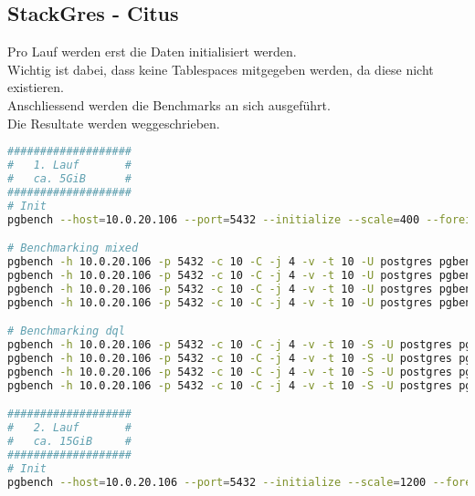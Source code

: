 
\begin{flushleft}
    \subsection{StackGres - Citus}
    \label{subsec:stackgres_citus_benchmarking_commands}
    Pro Lauf werden erst die Daten initialisiert werden.\\
    Wichtig ist dabei, dass keine Tablespaces mitgegeben werden, da diese nicht existieren.\\
    Anschliessend werden die Benchmarks an sich ausgeführt.\\
    Die Resultate werden weggeschrieben.
\lstset{style=gra_codestyle}
\begin{lstlisting}[language=bash, caption=StackGres-Citus - Benchmarking-Commands,captionpos=b,label={lst:stackgres_citus-benchmarking-commands},breaklines=true]
###################
#   1. Lauf       #
#   ca. 5GiB      #
###################
# Init
pgbench --host=10.0.20.106 --port=5432 --initialize --scale=400 --foreign-keys --fillfactor=100 --username=dtgvpf  --username=postgres pgbench_eval_bench

# Benchmarking mixed
pgbench -h 10.0.20.106 -p 5432 -c 10 -C -j 4 -v -t 10 -U postgres pgbench_eval_bench > /home/itgramic/1_1_stackgresmixed_benchmark.txt
pgbench -h 10.0.20.106 -p 5432 -c 10 -C -j 4 -v -t 10 -U postgres pgbench_eval_bench > /home/itgramic/1_2_stackgresmixed_benchmark.txt
pgbench -h 10.0.20.106 -p 5432 -c 10 -C -j 4 -v -t 10 -U postgres pgbench_eval_bench > /home/itgramic/1_3_stackgresmixed_benchmark.txt
pgbench -h 10.0.20.106 -p 5432 -c 10 -C -j 4 -v -t 10 -U postgres pgbench_eval_bench > /home/itgramic/1_4_stackgresmixed_benchmark.txt

# Benchmarking dql
pgbench -h 10.0.20.106 -p 5432 -c 10 -C -j 4 -v -t 10 -S -U postgres pgbench_eval_bench > /home/itgramic/1_1_stackgresdql_benchmark.txt
pgbench -h 10.0.20.106 -p 5432 -c 10 -C -j 4 -v -t 10 -S -U postgres pgbench_eval_bench > /home/itgramic/1_2_stackgresdql_benchmark.txt
pgbench -h 10.0.20.106 -p 5432 -c 10 -C -j 4 -v -t 10 -S -U postgres pgbench_eval_bench > /home/itgramic/1_3_stackgresdql_benchmark.txt
pgbench -h 10.0.20.106 -p 5432 -c 10 -C -j 4 -v -t 10 -S -U postgres pgbench_eval_bench > /home/itgramic/1_4_stackgresdql_benchmark.txt

###################
#   2. Lauf       #
#   ca. 15GiB     #
###################
# Init
pgbench --host=10.0.20.106 --port=5432 --initialize --scale=1200 --foreign-keys --fillfactor=100 --username=dtgvpf  --username=postgres pgbench_eval_bench


\end{lstlisting}
\end{flushleft}
